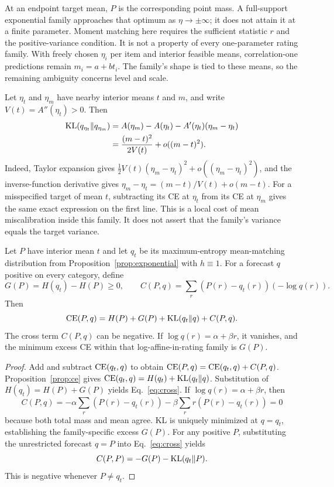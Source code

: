 At an endpoint target mean, $P$ is the corresponding point mass.
A full-support exponential family approaches that optimum as $\eta\to\pm\infty$; it does not attain it at a finite parameter.
Moment matching here requires the sufficient statistic $r$ and the positive-variance condition.
It is not a property of every one-parameter rating family.
With freely chosen $\eta_i$ per item and interior feasible means, correlation-one predictions remain $m_i=a+bt_i$.
The family's shape is tied to these means, so the remaining ambiguity concerns level and scale.

Let $\eta_t$ and $\eta_m$ have nearby interior means $t$ and $m$, and write $V(t)=A''(\eta_t)>0$.
Then
\begin{align}
 \operatorname{KL}(q_{\eta_t}\Vert q_{\eta_m})
 &=A(\eta_m)-A(\eta_t)-A'(\eta_t)(\eta_m-\eta_t)\\
 &=\frac{(m-t)^2}{2V(t)}+o((m-t)^2).\label{eq:localprice}
\end{align}
Indeed, Taylor expansion gives $\tfrac12 V(t)(\eta_m-\eta_t)^2+o((\eta_m-\eta_t)^2)$, and the inverse-function derivative gives $\eta_m-\eta_t=(m-t)/V(t)+o(m-t)$.
For a misspecified target of mean $t$, subtracting its CE at $\eta_t$ from its CE at $\eta_m$ gives the same exact expression on the first line.
This is a local cost of mean miscalibration inside this family.
It does not assert that the family's variance equals the target variance.

\begin{proposition}\label{prop:cross}
Let $P$ have interior mean $t$ and let $q_t$ be its maximum-entropy mean-matching distribution from Proposition~\ref{prop:exponential} with $h\equiv1$.
For a forecast $q$ positive on every category, define
\[
 G(P)=H(q_t)-H(P)\ge0,\qquad
 C(P,q)=\sum_r(P(r)-q_t(r))(-\log q(r)).
\]
Then
\begin{equation}\label{eq:cross}
 \operatorname{CE}(P,q)=H(P)+G(P)+\operatorname{KL}(q_t\Vert q)+C(P,q).
\end{equation}
The cross term $C(P,q)$ can be negative.
If $\log q(r)=\alpha+\beta r$, it vanishes, and the minimum excess CE within that log-affine-in-rating family is $G(P)$.
\end{proposition}
\begin{proof}
Add and subtract $\operatorname{CE}(q_t,q)$ to obtain $\operatorname{CE}(P,q)=\operatorname{CE}(q_t,q)+C(P,q)$.
Proposition~\ref{prop:ce} gives $\operatorname{CE}(q_t,q)=H(q_t)+\operatorname{KL}(q_t\Vert q)$.
Substitution of $H(q_t)=H(P)+G(P)$ yields Eq.~\eqref{eq:cross}.
If $\log q(r)=\alpha+\beta r$, then
\[
 C(P,q)=-\alpha\sum_r(P(r)-q_t(r))-\beta\sum_r r(P(r)-q_t(r))=0
\]
because both total mass and mean agree.
KL is uniquely minimized at $q=q_t$, establishing the family-specific excess $G(P)$.
For any positive $P$, substituting the unrestricted forecast $q=P$ into Eq.~\eqref{eq:cross} yields
\[
 C(P,P)=-G(P)-\operatorname{KL}(q_t\Vert P).
\]
This is negative whenever $P\ne q_t$.
\end{proof}

